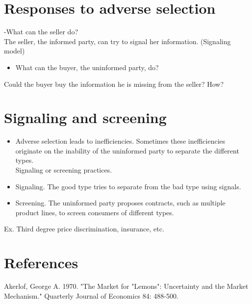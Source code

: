 \documentclass[10pt]{article}
\begin{document}
\section*{Responses to adverse selection}
-What can the seller do?\\
The seller, the informed party, can try to signal her information. (Signaling model)

\begin{itemize}
  \item What can the buyer, the uninformed party, do?
\end{itemize}

Could the buyer buy the information he is missing from the seller? How?

\section*{Signaling and screening}
\begin{itemize}
  \item Adverse selection leads to inefficiencies. Sometimes these inefficiencies originate on the inability of the uninformed party to separate the different types.\\
Signaling or screening practices.
  \item Signaling. The good type tries to separate from the bad type using signals.
  \item Screening. The uninformed party proposes contracts, such as multiple product lines, to screen consumers of different types.
\end{itemize}

Ex. Third degree price discrimination, insurance, etc.

\section*{References}
Akerlof, George A. 1970. "The Market for "Lemons": Uncertainty and the Market Mechanism." Quarterly Journal of Economics 84: 488-500.
\end{document}
